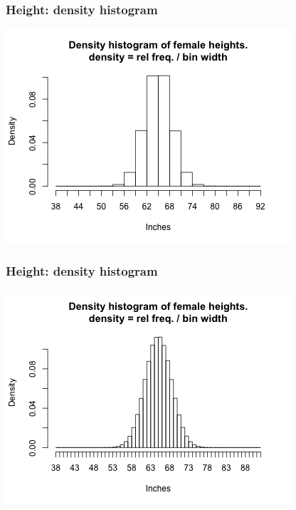 \documentclass[slidestop,compress,mathserif,12pt,t,professionalfonts,xcolor=table]{beamer}
\begin{document}
\begin{frame}
  \frametitle{Height: density histogram}

  \begin{center}
    \includegraphics[scale=0.7]{figures/density-histogram-3.png}
    \end{center}

\end{frame}

\begin{frame}
  \frametitle{Height: density histogram}

  \begin{center}
    \includegraphics[scale=0.7]{figures/density-histogram-1.png}
    \end{center}

\end{frame}
\end{document}
